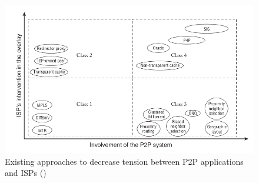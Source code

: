 \documentclass[
  oneside,
  11pt, a4paper,
  footinclude=true,
  headinclude=true,
  cleardoublepage=empty
]{scrbook}
\begin{document}
	\begin{figure}[!h]
    \centering
    \includegraphics[scale=0.65]{img/approaches-isp-p2p.png}
    \caption{Existing approaches to decrease tension between P2P applications and ISPs (\cite{dan-Commag10})}
    \label{fig:p2p-isp-interactions}
    \end{figure}
	
\end{document}
